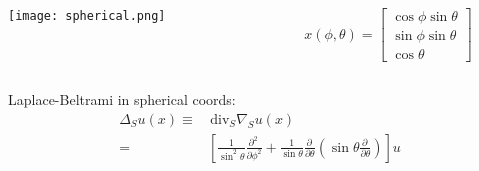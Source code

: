 \begin{frame}
\begin{columns}
\hspace{-1in}
\begin{column}{0.2\textwidth}
\begin{center}
\texttt{[image: spherical.png]}
\end{center}
\end{column}
\hspace{-1in}
\begin{column}{0.2\textwidth}
\begin{center}
\[
x(\phi,\theta) = 
 \left[ \begin{array}{c}
    \cos\phi \sin\theta \\ \sin\phi \sin\theta \\ \cos\theta \end{array} \right]
\]
\end{center}
\end{column}
\end{columns}

\vspace{.25in}
Laplace-Beltrami in spherical coords:
\begin{align*}
\Delta_S u(x) \equiv &  \, \mbox{div}_S \nabla_S u(x) \\
         = & \left[  \frac{1}{\sin^2 \theta} \frac{\partial^2 \, }{\partial\phi^2} 
             + \frac{1}{\sin\theta} \frac{\partial \,}{\partial \theta} \left( \sin\theta \frac{\partial \,}{\partial \theta} \right)
     \right] u      
\end{align*}
\end{frame}



